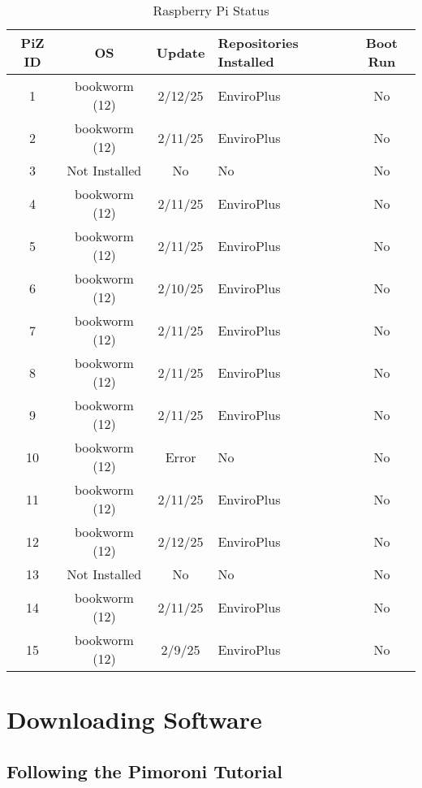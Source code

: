 \documentclass{article}
\begin{document}
\begin{table}[h!]
\begin{center}
\begin{tabular}{|c|c|c|p{2.3cm}|c|}
\hline
\textbf{PiZ ID} & \textbf{OS} & \textbf{Update} & \textbf{Repositories Installed} & \textbf{Boot Run} \\
\hline
1  & bookworm (12)    & 2/12/25 & EnviroPlus & No \\
2  & bookworm (12)    & 2/11/25 & EnviroPlus & No \\
3  & Not Installed    & No & No & No \\
4  & bookworm (12)    & 2/11/25 & EnviroPlus & No \\

5  & bookworm (12)    & 2/11/25 & EnviroPlus & No \\
6  & bookworm (12)    & 2/10/25 & EnviroPlus & No \\
7  & bookworm (12)    & 2/11/25 & EnviroPlus & No \\
8  & bookworm (12)    & 2/11/25 & EnviroPlus & No \\

9  & bookworm (12)    & 2/11/25 & EnviroPlus & No \\
10 & bookworm (12)    & Error & No & No \\
11 & bookworm (12)    & 2/11/25 & EnviroPlus & No \\
12 & bookworm (12)    & 2/12/25 & EnviroPlus & No \\

13 & Not Installed & No & No & No \\
14 & bookworm (12)    & 2/11/25 & EnviroPlus & No \\
15 & bookworm (12)    & 2/9/25  & EnviroPlus & No \\

\hline
\end{tabular}
\end{center}
\caption{Raspberry Pi Status}
\label{table:1}
\end{table}



\section{Downloading Software}

\subsection{Following the Pimoroni Tutorial}
\end{document}
